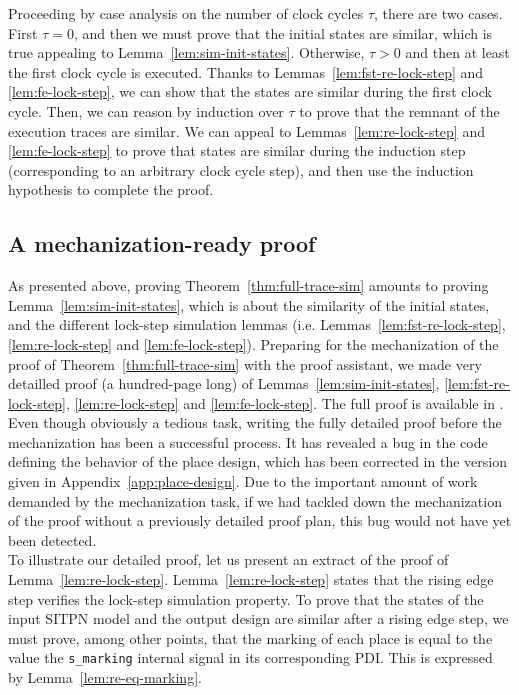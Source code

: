 \begin{pf}
  
  Proceeding by case analysis on the number of clock cycles $\tau$,
  there are two cases. First $\tau=0$, and then we must prove that the
  initial states are similar, which is true appealing to
  Lemma~\ref{lem:sim-init-states}. Otherwise, $\tau>0$ and then at
  least the first clock cycle is executed. Thanks to
  Lemmas~\ref{lem:fst-re-lock-step} and \ref{lem:fe-lock-step}, we can
  show that the states are similar during the first clock cycle. Then,
  we can reason by induction over $\tau$ to prove that the remnant of
  the execution traces are similar. We can appeal to
  Lemmas~\ref{lem:re-lock-step} and \ref{lem:fe-lock-step} to prove
  that states are similar during the induction step (corresponding to
  an arbitrary clock cycle step), and then use the induction
  hypothesis to complete the proof.

\end{pf}

\subsection{A mechanization-ready proof}
\label{sec:mecha-ready-pf}

As presented above, proving Theorem~\ref{thm:full-trace-sim} amounts
to proving Lemma~\ref{lem:sim-init-states}, which is about the
similarity of the initial states, and the different lock-step
simulation lemmas (i.e. Lemmas~\ref{lem:fst-re-lock-step},
\ref{lem:re-lock-step} and \ref{lem:fe-lock-step}). Preparing for the
mechanization of the proof of Theorem~\ref{thm:full-trace-sim} with
the \coq{} proof assistant, we made very detailled proof (a
hundred-page long) of Lemmas~\ref{lem:sim-init-states},
\ref{lem:fst-re-lock-step}, \ref{lem:re-lock-step} and
\ref{lem:fe-lock-step}. The full proof is available in
\cite{Iampietro2021}. Even though obviously a tedious task, writing
the fully detailed proof before the mechanization has been a
successful process. It has revealed a bug in the \vhdl{} code defining
the behavior of the place design, which has been corrected in the
version given in Appendix~\ref{app:place-design}.  Due to the
important amount of work demanded by the mechanization task, if we had
tackled down the mechanization of the proof without a previously
detailed proof plan, this bug would not have yet been detected. \\

To illustrate our detailed proof, let us present an extract of the
proof of Lemma~\ref{lem:re-lock-step}. Lemma~\ref{lem:re-lock-step}
states that the rising edge step verifies the lock-step simulation
property. To prove that the states of the input SITPN model and the
output design are similar after a rising edge step, we must prove,
among other points, that the marking of each place is equal to the
value the \texttt{s\_marking} internal signal in its corresponding
PDI. This is expressed by Lemma~\ref{lem:re-eq-marking}.

